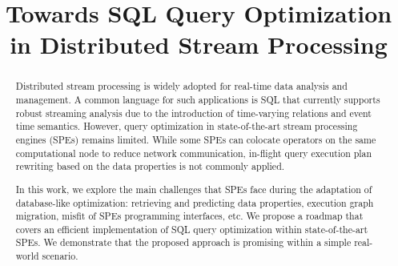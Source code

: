 \documentclass[sigconf]{acmart}
\theoremstyle{remark}
\begin{document}

\title {Towards SQL Query Optimization in Distributed Stream Processing}


\begin{abstract}

Distributed stream processing is widely adopted for real-time data analysis and management. A common language for such applications is SQL that currently supports robust streaming analysis due to the introduction of time-varying relations and event time semantics. However, query optimization in state-of-the-art stream processing engines (SPEs) remains limited. While some SPEs can colocate operators on the same computational node to reduce network communication, in-flight query execution plan rewriting based on the data properties is not commonly applied. 

In this work, we explore the main challenges that SPEs face during the adaptation of database-like optimization: retrieving and predicting data properties, execution graph migration, misfit of SPEs programming interfaces, etc. We propose a roadmap that covers an efficient implementation of SQL query optimization within state-of-the-art SPEs. We demonstrate that the proposed approach is promising within a simple real-world scenario.

\end{abstract}
\end{document}
